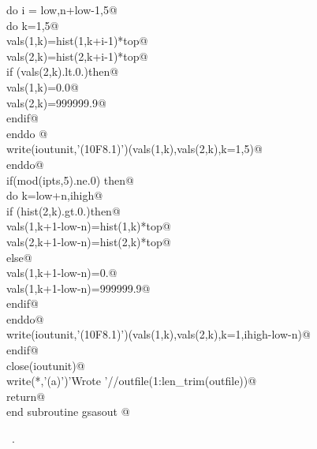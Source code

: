 \documentclass[10pt,a4paper,notitlepage]{article}
\begin{document}
\begin{flushleft}
\begin{minipage}{\linewidth}
\begin{list}{}{}
\mbox{}\verb@      do i = low,n+low-1,5@\\
\mbox{}\verb@       do k=1,5@\\
\mbox{}\verb@         vals(1,k)=hist(1,k+i-1)*top@\\
\mbox{}\verb@         vals(2,k)=hist(2,k+i-1)*top@\\
\mbox{}\verb@         if (vals(2,k).lt.0.)then@\\
\mbox{}\verb@           vals(1,k)=0.0@\\
\mbox{}\verb@           vals(2,k)=999999.9@\\
\mbox{}\verb@         endif@\\
\mbox{}\verb@       enddo @\\
\mbox{}\verb@       write(ioutunit,'(10F8.1)')(vals(1,k),vals(2,k),k=1,5)@\\
\mbox{}\verb@      enddo@\\
\mbox{}\verb@      if(mod(ipts,5).ne.0) then@\\
\mbox{}\verb@        do k=low+n,ihigh@\\
\mbox{}\verb@          if (hist(2,k).gt.0.)then@\\
\mbox{}\verb@           vals(1,k+1-low-n)=hist(1,k)*top@\\
\mbox{}\verb@           vals(2,k+1-low-n)=hist(2,k)*top@\\
\mbox{}\verb@          else@\\
\mbox{}\verb@           vals(1,k+1-low-n)=0.@\\
\mbox{}\verb@           vals(1,k+1-low-n)=999999.9@\\
\mbox{}\verb@          endif@\\
\mbox{}\verb@        enddo@\\
\mbox{}\verb@        write(ioutunit,'(10F8.1)')(vals(1,k),vals(2,k),k=1,ihigh-low-n)@\\
\mbox{}\verb@      endif@\\
\mbox{}\verb@      close(ioutunit)@\\
\mbox{}\verb@      write(*,'(a)')'Wrote '//outfile(1:len_trim(outfile))@\\
\mbox{}\verb@      return@\\
\mbox{}\verb@      end subroutine gsasout                                                 @{\NWsep}
\end{list}
\vspace{-1.5ex}
\footnotesize
\begin{list}{}{\setlength{\itemsep}{-\parsep}\setlength{\itemindent}{-\leftmargin}}
\item \NWtxtMacroRefIn\ .

\item{}
\end{list}
\end{minipage}\vspace{4ex}
\end{flushleft}
\end{document}

